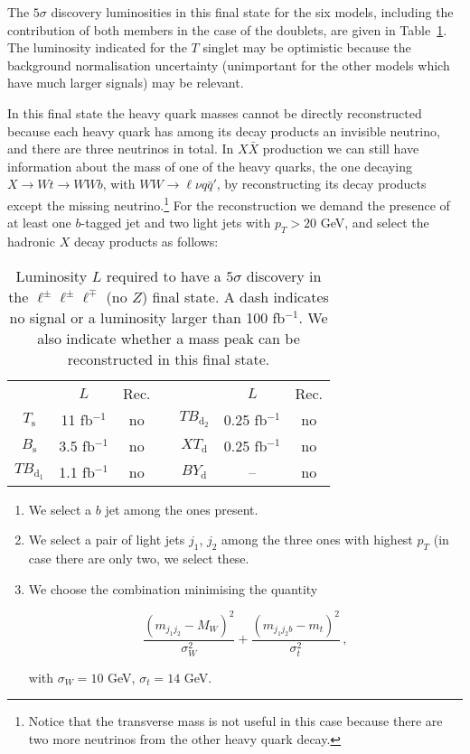 \documentclass[12pt,a4paper]{article}
\newcommand{\fbin}{fb$^{-1}$}
\newcommand{\XX}{X \bar X}
\newcommand{\Ts}{T_\text{s}}
\newcommand{\Bs}{B_\text{s}}
\newcommand{\TBd}{TB_{\text{d}_1}}
\newcommand{\TBD}{TB_{\text{d}_2}}
\newcommand{\XTd}{XT_\text{d}}
\newcommand{\BYd}{BY_\text{d}}
\begin{document}
%
The $5\sigma$ discovery luminosities in this final state for the six models, including the contribution of both members in the case of the doublets, are given in Table~\ref{tab:sig-3Q1-noZ}. 
The luminosity indicated for the $T$ singlet may be optimistic because the background normalisation uncertainty (unimportant for the other models which have much larger signals) may be relevant.


In this final state the heavy quark masses cannot be directly reconstructed because each heavy quark has among its decay products an invisible neutrino, and there are three neutrinos in total. 
In $\XX$ production we can still have information about the mass of one of the heavy quarks, the one decaying $X \to W t \to WWb$, with $WW \to \ell \nu q \bar q'$, by reconstructing its decay products except the missing neutrino.\footnote{Notice that the transverse mass is not useful in this case because there are two more neutrinos from the other heavy quark decay.} For the reconstruction we demand the presence of at least one $b$-tagged jet and two light jets with $p_T > 20$ GeV, and select the hadronic $X$ decay products as follows:
%
\begin{table}[t]
\begin{center}
\begin{tabular}{ccccccc}
       & $L$      & Rec. & \quad &        & $L$       & Rec. \\[1mm]
$\Ts$  & 11 \fbin  & no   &       & $\TBD$ & 0.25 \fbin & no \\
$\Bs$  & 3.5 \fbin & no   &       & $\XTd$ & 0.25 \fbin & no \\
$\TBd$ & 1.1 \fbin & no   &       & $\BYd$ & --        & no
\end{tabular}
\end{center}
\caption{Luminosity $L$ required to have a $5\sigma$ discovery in the $\ell^\pm \ell^\pm \ell^\mp$ (no $Z$) final state. A dash indicates no signal or a luminosity larger than 100 \fbin.
We also indicate whether a mass peak can be reconstructed in this final state.}
\label{tab:sig-3Q1-noZ}
\end{table}
%
\begin{enumerate}
\item We select a $b$ jet among the ones present.
\item We select a pair of light jets $j_1$, $j_2$ among the three ones with highest $p_T$ (in case there are only two, we select these.
\item We choose the combination minimising the quantity
\begin{small}
\begin{equation}
\frac{(m_{j_1 j_2}-M_W)^2}{\sigma_W^2} + 
\frac{(m_{j_1 j_2 b}-m_t)^2}{\sigma_t^2} \,,
\end{equation}
\end{small}%
with $\sigma_W = 10$ GeV, $\sigma_t = 14$ GeV.
\end{enumerate}
\end{document}
